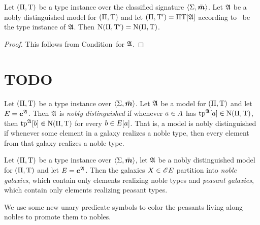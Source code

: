\begin{remark}
Let $(\Pi,\mathrm{T})$ be a type instance over the classified signature
$\left\langle \mathrm{\Sigma},\bar{\bm{m}} \right\rangle$. Let $\mathfrak{A}$ be a nobly distinguished model for
$(\Pi,\mathrm{T})$ and let $(\Pi,{\mathrm{T}'}) = \Pi\mathrm{T}[\mathfrak{A}]$ according
to~ be the type instance of $\mathfrak{A}$. Then
$\mathrm{\mathrm{N}}(\Pi,{\mathrm{T}'}) = \mathrm{\mathrm{N}}(\Pi,\mathrm{T})$.
\end{remark}
\begin{proof}
This follows from Condition~ for $\mathfrak{A}$.
\end{proof}

\section{TODO}

\begin{definition}
Let $(\Pi,\mathrm{T})$ be a type instance over $\left\langle \mathrm{\Sigma},\bar{\bm{m}} \right\rangle$.
Let $\mathfrak{A}$ be a model for $(\Pi,\mathrm{T})$ and let $E = \bm{e}^{\mathfrak{A}}$.
Then $\mathfrak{A}$ is \emph{nobly distinguished} if whenever $a \in A$ has
$\operatorname{tp}^{\mathfrak{A}}[a] \in \mathrm{\mathrm{N}}(\Pi,\mathrm{T})$, 
then $\operatorname{tp}^{\mathfrak{A}}[b] \in \mathrm{\mathrm{N}}(\Pi,\mathrm{T})$ for every $b \in E[a]$.
That is, a model is nobly distinguished if whenever some element in a galaxy
realizes a noble type, then every element from that galaxy realizes a noble
type.
\end{definition}
\begin{remark}
Let $(\Pi,\mathrm{T})$ be a type instance over $\left\langle \mathrm{\Sigma},\bar{\bm{m}} \right\rangle$, let $\mathfrak{A}$ be a
nobly distinguished model for $(\Pi,\mathrm{T})$ and let $E = \bm{e}^{\mathfrak{A}}$.
Then the galaxies $X \in {\mathscr{E}E}$ partition into \emph{noble galaxies},
which contain only elements realizing noble types and \emph{peasant galaxies},
which contain only elements realizing peasant types.
\end{remark}

We use some new unary predicate symbols to color the peasants living along 
nobles to promote them to nobles.

